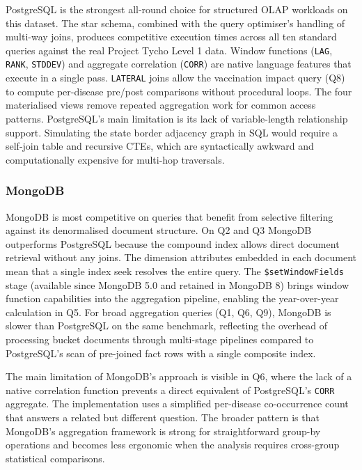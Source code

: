\documentclass[12pt,a4paper]{article}
\begin{document}
PostgreSQL is the strongest all-round choice for structured OLAP workloads on this dataset. The star schema, combined with the query optimiser's handling of multi-way joins, produces competitive execution times across all ten standard queries against the real Project Tycho Level 1 data. Window functions (\texttt{LAG}, \texttt{RANK}, \texttt{STDDEV}) and aggregate correlation (\texttt{CORR}) are native language features that execute in a single pass. \texttt{LATERAL} joins allow the vaccination impact query (Q8) to compute per-disease pre/post comparisons without procedural loops. The four materialised views remove repeated aggregation work for common access patterns. PostgreSQL's main limitation is its lack of variable-length relationship support. Simulating the state border adjacency graph in SQL would require a self-join table and recursive CTEs, which are syntactically awkward and computationally expensive for multi-hop traversals.

\subsubsection{MongoDB}

MongoDB is most competitive on queries that benefit from selective filtering against its denormalised document structure. On Q2 and Q3 MongoDB outperforms PostgreSQL because the compound index allows direct document retrieval without any joins. The dimension attributes embedded in each document mean that a single index seek resolves the entire query. The \texttt{\$setWindowFields} stage (available since MongoDB 5.0 and retained in MongoDB 8) brings window function capabilities into the aggregation pipeline, enabling the year-over-year calculation in Q5. For broad aggregation queries (Q1, Q6, Q9), MongoDB is slower than PostgreSQL on the same benchmark, reflecting the overhead of processing bucket documents through multi-stage pipelines compared to PostgreSQL's scan of pre-joined fact rows with a single composite index.

The main limitation of MongoDB's approach is visible in Q6, where the lack of a native correlation function prevents a direct equivalent of PostgreSQL's \texttt{CORR} aggregate. The implementation uses a simplified per-disease co-occurrence count that answers a related but different question. The broader pattern is that MongoDB's aggregation framework is strong for straightforward group-by operations and becomes less ergonomic when the analysis requires cross-group statistical comparisons.
\end{document}
